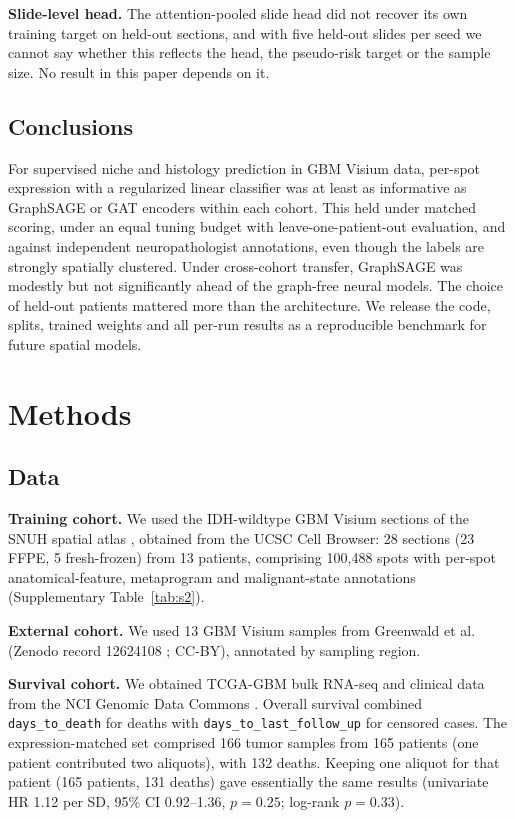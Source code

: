 \documentclass[11pt,letterpaper]{article}
\begin{document}
\textbf{Slide-level head.} The attention-pooled slide head did not recover its own training target on held-out sections, and with five held-out slides per seed we cannot say whether this reflects the head, the pseudo-risk target or the sample size. No result in this paper depends on it.

\subsection{Conclusions}

For supervised niche and histology prediction in GBM Visium data, per-spot expression with a regularized linear classifier was at least as informative as GraphSAGE or GAT encoders within each cohort. This held under matched scoring, under an equal tuning budget with leave-one-patient-out evaluation, and against independent neuropathologist annotations, even though the labels are strongly spatially clustered. Under cross-cohort transfer, GraphSAGE was modestly but not significantly ahead of the graph-free neural models. The choice of held-out patients mattered more than the architecture. We release the code, splits, trained weights and all per-run results as a reproducible benchmark for future spatial models.

\section{Methods}

\subsection{Data}

\textbf{Training cohort.} We used the IDH-wildtype GBM Visium sections of the SNUH spatial atlas \cite{park2026}, obtained from the UCSC Cell Browser: 28 sections (23 FFPE, 5 fresh-frozen) from 13 patients, comprising 100{,}488 spots with per-spot anatomical-feature, metaprogram and malignant-state annotations (Supplementary Table~\ref{tab:s2}).

\textbf{External cohort.} We used 13 GBM Visium samples from Greenwald et al.\ \cite{greenwald2024} (Zenodo record 12624108 \cite{greenwald2024data}; CC-BY), annotated by sampling region.

\textbf{Survival cohort.} We obtained TCGA-GBM bulk RNA-seq and clinical data from the NCI Genomic Data Commons \cite{tcga2008}. Overall survival combined \texttt{days\_to\_death} for deaths with \texttt{days\_to\_last\_follow\_up} for censored cases. The expression-matched set comprised 166 tumor samples from 165 patients (one patient contributed two aliquots), with 132 deaths. Keeping one aliquot for that patient (165 patients, 131 deaths) gave essentially the same results (univariate HR 1.12 per SD, 95\% CI 0.92--1.36, $p = 0.25$; log-rank $p = 0.33$).
\end{document}
